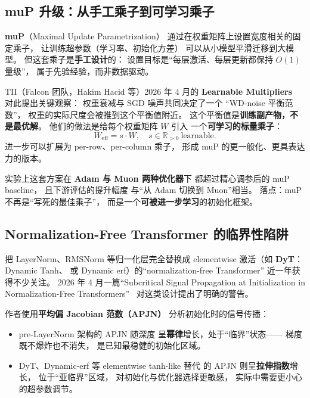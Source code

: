 \subsection{muP 升级：从手工乘子到可学习乘子}
\label{sec:learnable-mup}

\textbf{muP}（Maximal Update Parametrization）
通过在权重矩阵上设置宽度相关的固定乘子，
让训练超参数（学习率、初始化方差）
可以从小模型平滑迁移到大模型。
但这套乘子是\textbf{手工设计}的：
设置目标是“每层激活、每层更新都保持 $O(1)$ 量级”，
属于先验经验，而非数据驱动。

TII（Falcon 团队，Hakim Hacid 等）2026 年 4 月的
\textbf{Learnable Multipliers}~\cite{learnable_multipliers_2026}
对此提出关键观察：
权重衰减与 SGD 噪声共同决定了一个
“WD-noise 平衡范数”，
权重的实际尺度会被推到这个平衡值附近。
这个平衡值是\textbf{训练副产物，不是最优解}。
他们的做法是给每个权重矩阵 $W$ 引入
一个\textbf{可学习的标量乘子}：
\begin{equation}
  W_{\text{eff}} = s \cdot W,\quad s \in \mathbb{R}_{>0}\ \text{learnable}.
\end{equation}
进一步可以扩展为 per-row、per-column 乘子，
形成 muP 的更一般化、更具表达力的版本。

实验上这套方案在 \textbf{Adam 与 Muon 两种优化器}下
都超过精心调参后的 muP baseline，
且下游评估的提升幅度
与“从 Adam 切换到 Muon”相当。
落点：muP 不再是“写死的最佳乘子”，
而是一个\textbf{可被进一步学习}的初始化框架。

\subsection{Normalization-Free Transformer 的临界性陷阱}
\label{sec:dyt-warning}

把 LayerNorm、RMSNorm 等归一化层完全替换成
elementwise 激活（如 \textbf{DyT}：Dynamic Tanh、
或 Dynamic erf）的“normalization-free Transformer”
近一年获得不少关注。
2026 年 4 月一篇“Subcritical Signal Propagation at
Initialization in Normalization-Free
Transformers”~\cite{subcritical_dyt_2026}
对这类设计提出了明确的警告。

作者使用\textbf{平均偏 Jacobian 范数（APJN）}
分析初始化时的信号传播：
\begin{itemize}[noitemsep]
  \item pre-LayerNorm 架构的 APJN 随深度
        呈\textbf{幂律}增长，处于“临界”状态——
        梯度既不爆炸也不消失，
        是已知最稳健的初始化区域。
  \item DyT、Dynamic-erf 等 elementwise tanh-like 替代
        的 APJN 则呈\textbf{拉伸指数}增长，
        位于“亚临界”区域，
        对初始化与优化器选择更敏感，
        实际中需要更小心的超参数调节。
\end{itemize}

